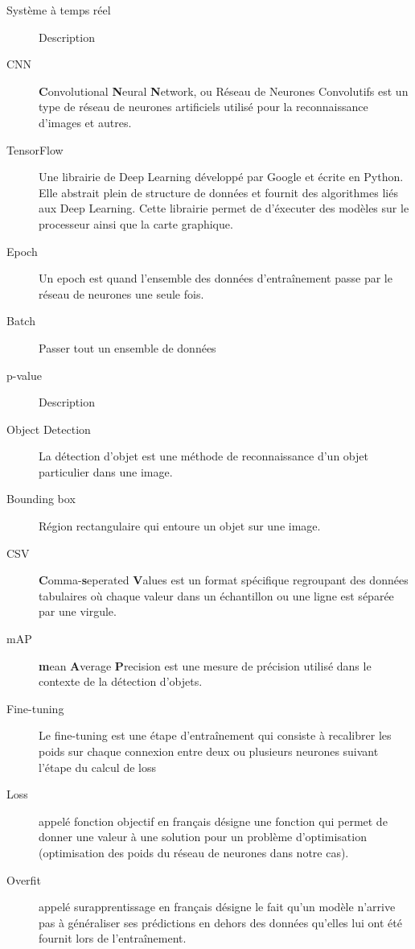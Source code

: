 \documentclass[french]{article}
\theoremstyle{mytheoremstyle}
\theoremstyle{mytheoremstyle}
\theoremstyle{myproblemstyle}
\begin{document}
\begin{description}  
\item [Système à temps réel] Description
\item [CNN] \textbf{C}onvolutional \textbf{N}eural \textbf{N}etwork, ou Réseau de Neurones Convolutifs est un type de réseau de neurones artificiels utilisé pour la reconnaissance d'images et autres.
\item [TensorFlow] Une librairie de Deep Learning développé par Google et écrite en Python. Elle abstrait plein de structure de données et fournit des algorithmes liés aux Deep Learning. Cette librairie permet de d'éxecuter des modèles sur le processeur ainsi que la carte graphique.
\item [Epoch] Un epoch est quand l'ensemble des données d'entraînement passe par le réseau de neurones une seule fois.
\item [Batch] Passer tout un ensemble de données 
\item [p-value] Description
\item [Object Detection] La détection d'objet est une méthode de reconnaissance d'un objet particulier dans une image.
\item [Bounding box] Région rectangulaire qui entoure un objet sur une image.
\item [CSV] \textbf{C}omma-\textbf{s}eperated \textbf{V}alues est un format spécifique regroupant des données tabulaires où chaque valeur dans un échantillon ou une ligne est séparée par une virgule.
\item [mAP] \textbf{m}ean \textbf{A}verage \textbf{P}recision est une mesure de précision utilisé dans le contexte de la détection d'objets.
\item [Fine-tuning] Le fine-tuning est une étape d'entraînement qui consiste à recalibrer les poids sur chaque connexion entre deux ou plusieurs neurones suivant l'étape du calcul de loss
\item [Loss] appelé fonction objectif en français désigne une fonction qui permet de donner une valeur à une solution pour un problème d'optimisation (optimisation des poids du réseau de neurones dans notre cas).
\item [Overfit] appelé surapprentissage en français désigne le fait qu'un modèle n'arrive pas à généraliser ses prédictions en dehors des données qu'elles lui ont été fournit lors de l'entraînement.
\end{description}
\end{document}
